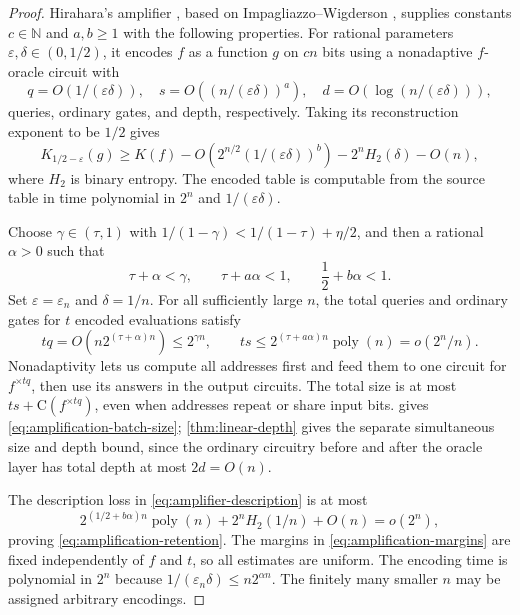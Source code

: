 \documentclass[11pt]{article}
\newcommand{\C}{\mathrm{C}}
\newcommand{\poly}{\operatorname{poly}}
\begin{document}
\begin{proof}
Hirahara's amplifier \cite[Lemma~8.1]{Hirahara2022}, based on
Impagliazzo--Wigderson \cite{ImpagliazzoWigderson1997}, supplies constants
$c\in\mathbb N$ and $a,b\ge1$ with the following properties.  For
rational parameters $\varepsilon,\delta\in(0,1/2)$, it encodes $f$ as a function
$g$ on $cn$ bits using a nonadaptive $f$-oracle circuit with
\[
 q=O(1/(\varepsilon\delta)),\quad
 s=O\!\left((n/(\varepsilon\delta))^a\right),\quad
 d=O(\log(n/(\varepsilon\delta))),
\]
queries, ordinary gates, and depth, respectively.  Taking its
reconstruction exponent to be $1/2$ gives
\begin{equation}\label{eq:amplifier-description}
 K_{1/2-\varepsilon}(g)
 \ge K(f)-O\!\left(2^{n/2}(1/(\varepsilon\delta))^b\right)
              -2^nH_2(\delta)-O(n),
\end{equation}
where $H_2$ is binary entropy.  The encoded table is computable from
the source table in time polynomial in $2^n$ and $1/(\varepsilon\delta)$.

Choose $\gamma\in(\tau,1)$ with
$1/(1-\gamma)<1/(1-\tau)+\eta/2$, and then a rational $\alpha>0$ such that
\begin{equation}\label{eq:amplification-margins}
 \tau+\alpha<\gamma,\qquad
 \tau+a\alpha<1,\qquad
 \frac12+b\alpha<1.
\end{equation}
Set $\varepsilon=\varepsilon_n$ and $\delta=1/n$.  For all sufficiently
large $n$, the total queries and ordinary gates for $t$ encoded evaluations
satisfy
\[
 tq=O\!\left(n2^{(\tau+\alpha)n}\right)\le2^{\gamma n},
 \qquad
 ts\le2^{(\tau+a\alpha)n}\poly(n)=o(2^n/n).
\]
Nonadaptivity lets us compute all addresses first and feed them to one
circuit for $f^{\times tq}$, then use its answers in the output circuits.
The total size is at most $ts+\C(f^{\times tq})$, even when addresses
repeat or share input bits.   gives
\eqref{eq:amplification-batch-size}; \cref{thm:linear-depth} gives the
separate simultaneous size and depth bound, since the ordinary circuitry
before and after the oracle layer has total depth at most $2d=O(n)$.

The description loss in \eqref{eq:amplifier-description} is at most
\[
 2^{(1/2+b\alpha)n}\poly(n)+2^nH_2(1/n)+O(n)=o(2^n),
\]
proving \eqref{eq:amplification-retention}.  The margins in
\eqref{eq:amplification-margins} are fixed independently of $f$ and $t$,
so all estimates are uniform.  The encoding time is polynomial in $2^n$
because $1/(\varepsilon_n\delta)\le n2^{\alpha n}$.
The finitely many smaller $n$ may be assigned arbitrary encodings.
\end{proof}
\end{document}
